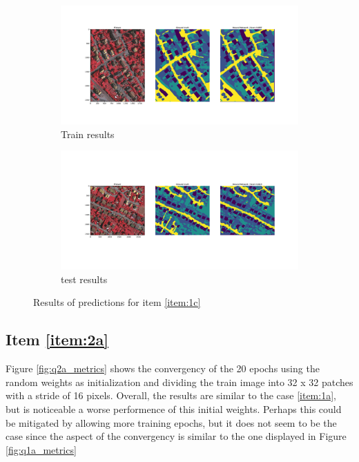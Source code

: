 \documentclass[10pt, a4paper]{article}
\begin{document}
\begin{figure}[htpb]
  \centering
  \begin{subfigure}[b]{0.45\textwidth}
      \centering
      \includegraphics[width=\textwidth]{images/Patch128_imagenet_train.pdf}
      \caption{Train results}
      \label{fig:q1c_train}
  \end{subfigure}
  \hspace{0.05\textwidth}
  \begin{subfigure}[b]{0.45\textwidth}
    \centering
    \includegraphics[width=\textwidth]{images/Patch128_imagenet_test.pdf}
    \caption{test results}
    \label{fig:q1c_test}
  \end{subfigure}
  \caption{Results of predictions for item \ref{item:1c}}
  \label{fig:q1c_results}
\end{figure}

\newpage
\subsection{Item \ref{item:2a}}

Figure \ref{fig:q2a_metrics} shows the convergency of the 20 epochs using the random weights as initialization and dividing the train image into 32 x 32 patches 
with a stride of 16 pixels. Overall, the results are similar to the case \ref{item:1a}, but is noticeable a worse performence of this initial weights. Perhaps this
could be mitigated by allowing more training epochs, but it does not seem to be the case since the aspect of the convergency is similar to the one displayed in
Figure \ref{fig:q1a_metrics}
\end{document}
